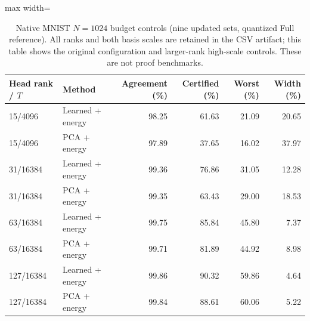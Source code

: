 \begin{table}[tp]
\caption{Native MNIST $N=1024$ budget controls (nine updated sets, quantized Full reference). All ranks and both basis scales are retained in the CSV artifact; this table shows the original configuration and larger-rank high-scale controls. These are not proof benchmarks.}\label{tab:native-certificate-budget}
\centering\small
\begin{adjustbox}{max width=\textwidth}
\begin{tabular}{@{}llrrrr@{}}
\toprule
Head rank / $T$ & Method & Agreement (\%) & Certified (\%) & Worst (\%) & Width (\%) \\
\midrule
15/4096 & Learned + energy & 98.25 & 61.63 & 21.09 & 20.65 \\
15/4096 & PCA + energy & 97.89 & 37.65 & 16.02 & 37.97 \\
31/16384 & Learned + energy & 99.36 & 76.86 & 31.05 & 12.28 \\
31/16384 & PCA + energy & 99.35 & 63.43 & 29.00 & 18.53 \\
63/16384 & Learned + energy & 99.75 & 85.84 & 45.80 & 7.37 \\
63/16384 & PCA + energy & 99.71 & 81.89 & 44.92 & 8.98 \\
127/16384 & Learned + energy & 99.86 & 90.32 & 59.86 & 4.64 \\
127/16384 & PCA + energy & 99.84 & 88.61 & 60.06 & 5.22 \\
\bottomrule
\end{tabular}
\end{adjustbox}
\end{table}
